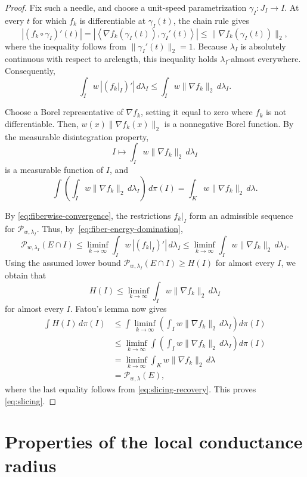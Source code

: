 \documentclass[11pt]{article}
\theoremstyle{definition}
\theoremstyle{remark}
\newcommand{\cP}{\mathcal P}
\begin{document}
\begin{proof}
Fix such a needle, and choose a unit-speed parametrization
\(\gamma_I:J_I\to I\).  At every
\(t\) for which \(f_k\) is differentiable at \(\gamma_I(t)\), the chain
rule gives
\[
 |(f_k\circ\gamma_I)'(t)|=\left|\left\langle \nabla f_k(\gamma_I(t)),\gamma_I'(t) \right\rangle\right|\leq \|\nabla f_k(\gamma_I(t))\|_2,
\]
where the inequality follows from $\|\gamma_I'(t)\|_2=1$.  Because
\(\lambda_I\) is absolutely continuous with respect to arclength, this
inequality holds \(\lambda_I\)-almost everywhere.  Consequently,
\begin{equation}\label{eq:fiber-energy-domination}
 \int_I w\,\left|(f_k|_I)'\right|\,d\lambda_I
 \le
 \int_Iw\|\nabla f_k\|_2\,d\lambda_I.
\end{equation}

Choose a Borel representative of \(\nabla f_k\), setting it equal to
zero where \(f_k\) is not differentiable. Then, $w(x)\|\nabla f_k(x)\|_2$ is a nonnegative Borel function.  By the measurable disintegration property,
\[
 I\longmapsto \int_Iw\|\nabla f_k\|_2\,d\lambda_I
\]
is a measurable function of \(I\), and
\[
 \int \left( \int_Iw\|\nabla f_k\|_2\,d\lambda_I \right)\,d\pi(I)
 =
 \int_Kw\|\nabla f_k\|_2\,d\lambda.
\]

By \eqref{eq:fiberwise-convergence}, the restrictions \(f_k|_I\) form
an admissible sequence for $\mathcal{P}_{w,\lambda_I}$.  Thus, by~\eqref{eq:fiber-energy-domination},
\[
 \mathcal P_{w,\lambda_I}(E\cap I)
 \le
 \liminf_{k\to\infty}
 \int_I w\,\left|(f_k|_I)'\right|\,d\lambda_I
 \le
 \liminf_{k\to\infty}
 \int_Iw\|\nabla f_k\|_2\,d\lambda_I.
\]
Using the assumed lower bound $\cP_{w,\lambda_I}(E\cap I)\ge H(I)$ for almost every $I$, we obtain that
\[
 H(I)
 \le
 \liminf_{k\to\infty}
 \int_Iw\|\nabla f_k\|_2\,d\lambda_I
\]
for almost every \(I\). Fatou's lemma now gives
\begin{align*}
 \int H(I)\,d\pi(I)
 &\le
 \int
 \liminf_{k\to\infty}
 \left(
  \int_Iw\|\nabla f_k\|_2\,d\lambda_I
 \right)d\pi(I)\\
 &\le
 \liminf_{k\to\infty}
 \int
 \left(
  \int_Iw\|\nabla f_k\|_2\,d\lambda_I
 \right)d\pi(I)\\
 &=
 \liminf_{k\to\infty}
 \int_Kw\|\nabla f_k\|_2\,d\lambda\\
 &=
 \mathcal P_{w,\lambda}(E),
\end{align*}
where the last equality follows from
\eqref{eq:slicing-recovery}.  This proves
\eqref{eq:slicing}.
\end{proof}


\section{Properties of the local conductance radius}
\label{app:proof_local_cond}
\end{document}
